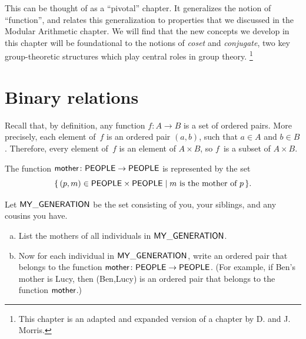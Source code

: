 


\newcommand{\class}[1]{\overline{#1}}
\newcommand{\divides}{\mbox{|}}

\medskip\noindent

This can be thought of as a ``pivotal'' chapter. It generalizes the notion of ``function'', and relates this generalization to properties that we discussed in the Modular Arithmetic chapter. We will find that the new concepts we develop in this chapter will be foundational to the notions of \emph{coset} and \emph{conjugate}, two key group-theoretic structures which play central roles in group theory.
\footnote{This chapter  is an adapted and expanded version of a chapter by D. and J. Morris.}

\section{Binary relations} \label{sec.relation}


 Recall that, by definition, any function $f \colon A \to B$ is a set of ordered pairs. More precisely, each element of~$f$ is an ordered pair $(a,b)$, such that $a \in A$ and $b \in B$. Therefore, every element of~$f$ is an element of $A \times B$, so $f$~is a subset of $A \times B$.


\begin{eg} 
The function $\sf{mother} \colon \sf{PEOPLE} \to \sf{PEOPLE}$ is represented by the set
	$$ \{\, (p,m) \in  \sf{PEOPLE} \times \sf{PEOPLE} \mid \text{$m$ is the mother of~$p$} \,\} .$$
\end{eg}

\begin{exercise}\label{exercise:EquivalenceRelationsChap:student_mother}

\noindent
Let $\sf{MY\_GENERATION}$ be the set consisting  of you, your siblings, and any cousins you have.  
\begin{enumerate}[(a)]
\item
List the mothers of all individuals in $\sf{MY\_GENERATION}$.
\item
Now for each individual in $\sf{MY\_GENERATION}$, write an ordered pair that belongs to the function $\sf{mother} \colon \sf{PEOPLE} \to \sf{PEOPLE}$. (For example, if Ben's  mother is Lucy, then (Ben,Lucy) is an ordered pair that belongs to the function $\sf{mother}$.)
\end{enumerate}
\end{exercise}


